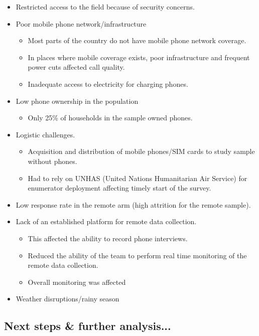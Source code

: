 \documentclass[11pt,harvard]{article}
\begin{document}
	\begin{itemize}[label=--, left=2.5em]
		\item[1.] Restricted access to the field because of security concerns.
		\item[2.] Poor mobile phone network/infrastructure 
		\begin{itemize}[label=--, left=1.75em]
			\item[a.]	Most parts of the country do not have mobile phone network coverage.
			\item[b.]	In places where mobile coverage exists, poor infrastructure and frequent power cuts affected call quality.
			\item[c.]	Inadequate access to electricity for charging phones.
		\end{itemize}
		\item[3.] Low phone ownership in the population
		\begin{itemize}[label=--, left=1.75em]
			\item[a.] Only 25\% of households in the sample owned phones.
		\end{itemize}
		\item[4.] Logistic challenges.
		\begin{itemize}[label=--, left=1.75em]
			\item[a.]	Acquisition and distribution of mobile phones/SIM cards to study sample without phones.
			\item[b.]	Had to rely on UNHAS (United Nations Humanitarian Air Service) for enumerator deployment affecting timely start of the survey.
		\end{itemize}
		\item[5.] Low response rate in the remote arm (high attrition for the remote sample).
		\item[6.] Lack of an established platform for remote data collection. 
		\begin{itemize}[label=--, left=1.75em]
			\item [a.] This affected the ability to record phone interviews.
			\item [b.] Reduced the ability of the team to perform real time monitoring of the remote data collection.
			\item [c.] Overall monitoring was affected
		\end{itemize}
		\item[7.] Weather disruptions/rainy season
	\end{itemize}
	
	
	\subsection{Next steps \& further analysis...}
	
\end{document}
